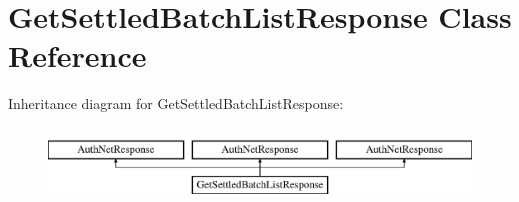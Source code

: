 \hypertarget{interface_get_settled_batch_list_response}{
\section{GetSettledBatchListResponse Class Reference}
\label{interface_get_settled_batch_list_response}
}
Inheritance diagram for GetSettledBatchListResponse:\begin{figure}[H]
\begin{center}
\leavevmode
\includegraphics[height=2.000000cm]{interface_get_settled_batch_list_response}
\end{center}
\end{figure}

